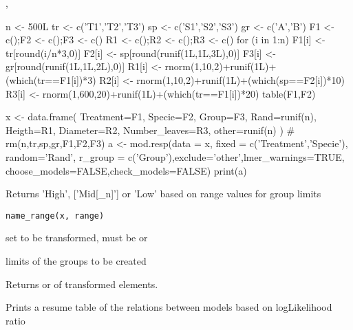 \documentclass[letterpaper]{book}
\begin{document}
%
\begin{References}\relax
{}, 
\end{References}
%
\begin{Examples}
\begin{ExampleCode}
n <- 500L
tr <- c('T1','T2','T3')
sp <- c('S1','S2','S3')
gr <- c('A','B')
F1 <- c();F2 <- c();F3 <- c()
R1 <- c();R2 <- c();R3 <- c()
for (i in 1:n) {
 F1[i] <- tr[round(i/n*3,0)]
 F2[i] <- sp[round(runif(1L,1L,3L),0)]
 F3[i] <- gr[round(runif(1L,1L,2L),0)]
 R1[i] <- rnorm(1,10,2)+runif(1L)+(which(tr==F1[i])*3)
 R2[i] <- rnorm(1,10,2)+runif(1L)+(which(sp==F2[i])*10)
 R3[i] <- rnorm(1,600,20)+runif(1L)+(which(tr==F1[i])*20)
}
table(F1,F2)

x <- data.frame(
    Treatment=F1,
    Specie=F2,
    Group=F3,
    Rand=runif(n),
    Heigth=R1,
    Diameter=R2,
    Number_leaves=R3,
    other=runif(n)
)
# rm(n,tr,sp,gr,F1,F2,F3)
a <- mod.resp(data = x, fixed = c('Treatment','Specie'), random='Rand',
              r_group = c('Group'),exclude='other',lmer_warnings=TRUE,
              choose_models=FALSE,check_models=FALSE)
print(a)
\end{ExampleCode}
\end{Examples}
%
\begin{Description}\relax
Returns 'High', ['Mid[\_n]'] or 'Low' based on range values for group limits
\end{Description}
%
\begin{Usage}
\begin{verbatim}
name_range(x, range)
\end{verbatim}
\end{Usage}
%
\begin{Arguments}
\begin{ldescription}
\item[\code{x}] 
 set to be transformed, must be  or 

\item[\code{range}] 
limits of the groups to be created


\end{ldescription}
\end{Arguments}
%
\begin{Value}
Returns  or  of transformed elements.
\end{Value}
%
\begin{Description}\relax
Prints a resume table of the relations between models based on logLikelihood ratio
\end{Description}
\printindex{}
\end{document}
